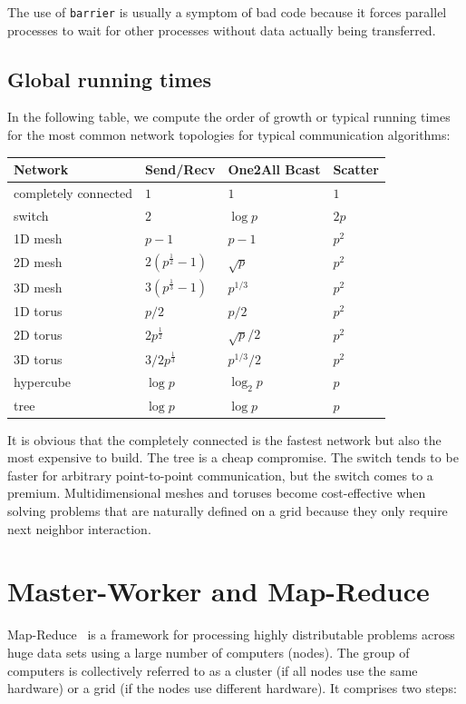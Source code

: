 \documentclass[justified, sixbynine]{tufte-book}
\def\ft{\small\tt}
\theoremstyle{plain}%
\newtheorem * {corollary}{Corollary}
\theoremstyle{definition}
\theoremstyle{remark}
\newtheorem * {remark}{Remark}
\newtheorem * {note}{Note}
\begin{document}
\begin{fullwidth}
The use of {\ft barrier} is usually a symptom of bad code because it forces parallel processes to wait for other processes without data actually being transferred.

\goodbreak\subsection{Global running times}

In the following table, we compute the order of growth or typical running times for the most common network topologies for typical communication algorithms:

\begin{tabular}{|l|lll|} \hline
Network & Send/Recv & One2All Bcast & Scatter \\ \hline
completely connected & $1$ & $1$ & $1$ \\
switch  & $2$ & $\log p$ & $2p$ \\
1D mesh  & $p-1$ & $p-1$ & $p^2$ \\
2D mesh  & $2(p^{\frac12}-1)$ & $\sqrt{p}$ & $p^2$ \\
3D mesh  & $3(p^{\frac13}-1)$ & $p^{1/3}$ & $p^2$ \\
1D torus  & $p/2$ & $p/2$ & $p^2$ \\
2D torus  & $2p^{\frac12}$ & $\sqrt{p}/2$ & $p^2$ \\
3D torus  & $3/2 p^{\frac13}$ & $p^{1/3}/2$ & $p^2$ \\
hypercube  & $\log p$ & $\log_2 p$ & $p$ \\
tree  & $\log p$ & $\log p$ & $p$
\\ \hline
\end{tabular}

It is obvious that the completely connected is the fastest network but also the most expensive to build. The tree is a cheap compromise. The switch tends to be faster for arbitrary point-to-point communication, but the switch comes to a premium. Multidimensional meshes and toruses become cost-effective when solving problems that are naturally defined on a grid because they only require next neighbor interaction.

\goodbreak\section{Master-Worker and Map-Reduce}

Map-Reduce~\cite{mapreduce} is a framework for processing highly distributable problems across huge data sets using a large number of computers (nodes). The group of computers is collectively referred to as a cluster (if all nodes use the same hardware) or a grid (if the nodes use different hardware). It comprises two steps:


\end{fullwidth}
\end{document}
